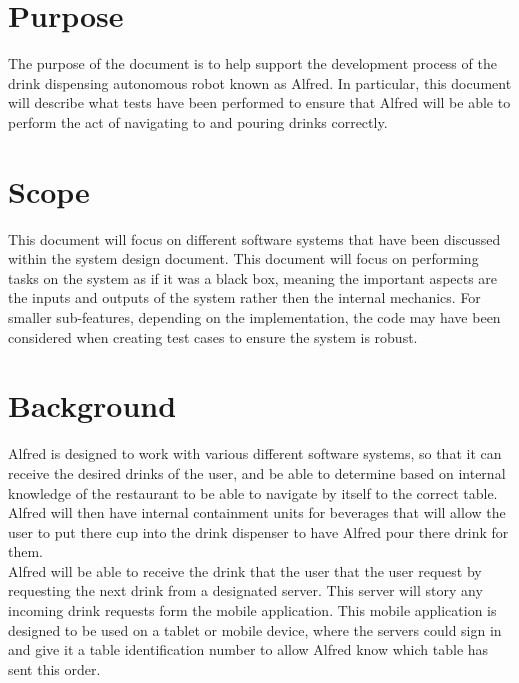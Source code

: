 \documentclass [10pt]{article}
\begin{document}
\pagebreak




\section {Purpose}


The purpose of the document is to help support the development process of the drink dispensing autonomous robot known as Alfred. In particular, this document will describe what tests have been performed to ensure that Alfred will be able to perform the act of navigating to and pouring drinks correctly. 

\section {Scope}
This document will focus on different software systems that have been discussed within the system design document. This document will focus on performing tasks on the system as if it was a black box, meaning the important aspects are the inputs and outputs of the system rather then the internal mechanics. For smaller sub-features, depending on the implementation, the code may have been considered when creating test cases to ensure the system is robust. 

\section{Background}

Alfred is designed to work with various different software systems, so that it can receive the desired drinks of the user, and be able to determine based on internal knowledge of the restaurant to be able to navigate by itself to the correct table. Alfred will then have internal containment units for beverages that will allow the user to put there cup into the drink dispenser to have Alfred pour there drink for them.\\

 Alfred will be able to receive the drink that the user that the user request by requesting the next drink from a designated server. This server will story any incoming drink requests form the mobile application. This mobile application is designed to be used on a tablet or mobile device, where the servers could sign in and give it a table identification number to allow Alfred know which table has sent this order.\\
 
\end{document}
